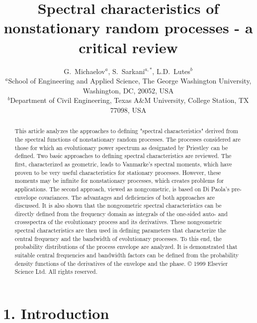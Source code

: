 \documentclass[12pt]{article}
\title{Spectral characteristics of nonstationary random processes - a critical review}
\author{
G.~Michaelov$^{a}$, S.~Sarkani$^{a,*}$, L.D.~Lutes$^{b}$\\[1ex]
$^{a}$School of Engineering and Applied Science, The George Washington University, Washington, DC, 20052, USA\\
$^{b}$Department of Civil Engineering, Texas A\&M University, College Station, TX 77098, USA
}
\date{}
\begin{document}
\maketitle

\begin{abstract}
This article analyzes the approaches to defining "spectral characteristics" derived from the spectral functions of nonstationary random processes. The processes considered are those for which an evolutionary power spectrum as designated by Priestley can be defined. Two basic approaches to defining spectral characteristics are reviewed. The first, characterized as geometric, leads to Vanmarke's spectral moments, which have proven to be very useful characteristics for stationary processes. However, these moments may be infinite for nonstationary processes, which creates problems for applications. The second approach, viewed as nongcometric, is based on Di Paola's pre-envelope covariances. The advantages and deficiencies of both approaches are discussed. It is also shown that the nongeometric spectral characteristics can be directly defined from the frequency domain as integrals of the one-sided auto- and crossspectra of the evolutionary process and its derivatives. These nongeometric spectral characteristics are then used in defining parameters that characterize the central frequency and the bandwidth of evolutionary processes. To this end, the probability distributions of the process envelope are analyzed. It is demonstrated that suitable central frequencies and bandwidth factors can be defined from the probability density functions of the derivatives of the envelope and the phase. © 1999 Elsevier Science Ltd. All rights reserved.
\end{abstract}

\section*{1. Introduction}
\end{document}
